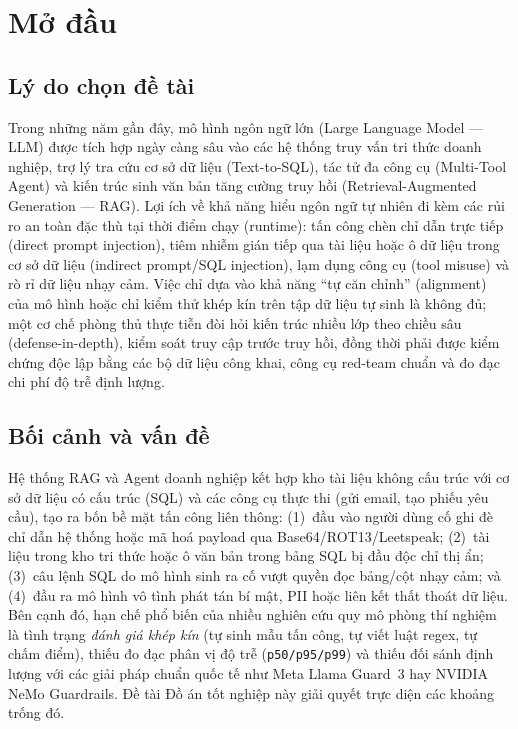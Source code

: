 \chapter*{Mở đầu}

\section*{Lý do chọn đề tài}

Trong những năm gần đây, mô hình ngôn ngữ lớn (Large Language Model --- LLM) được tích hợp ngày càng sâu vào các hệ thống truy vấn tri thức doanh nghiệp, trợ lý tra cứu cơ sở dữ liệu (Text-to-SQL), tác tử đa công cụ (Multi-Tool Agent) và kiến trúc sinh văn bản tăng cường truy hồi (Retrieval-Augmented Generation --- RAG). Lợi ích về khả năng hiểu ngôn ngữ tự nhiên đi kèm các rủi ro an toàn đặc thù tại thời điểm chạy (runtime): tấn công chèn chỉ dẫn trực tiếp (direct prompt injection), tiêm nhiễm gián tiếp qua tài liệu hoặc ô dữ liệu trong cơ sở dữ liệu (indirect prompt/SQL injection), lạm dụng công cụ (tool misuse) và rò rỉ dữ liệu nhạy cảm. Việc chỉ dựa vào khả năng ``tự căn chỉnh'' (alignment) của mô hình hoặc chỉ kiểm thử khép kín trên tập dữ liệu tự sinh là không đủ; một cơ chế phòng thủ thực tiễn đòi hỏi kiến trúc nhiều lớp theo chiều sâu (defense-in-depth), kiểm soát truy cập trước truy hồi, đồng thời phải được kiểm chứng độc lập bằng các bộ dữ liệu công khai, công cụ red-team chuẩn và đo đạc chi phí độ trễ định lượng.

\section*{Bối cảnh và vấn đề}

Hệ thống RAG và Agent doanh nghiệp kết hợp kho tài liệu không cấu trúc với cơ sở dữ liệu có cấu trúc (SQL) và các công cụ thực thi (gửi email, tạo phiếu yêu cầu), tạo ra bốn bề mặt tấn công liên thông: (1)~đầu vào người dùng cố ghi đè chỉ dẫn hệ thống hoặc mã hoá payload qua Base64/ROT13/Leetspeak; (2)~tài liệu trong kho tri thức hoặc ô văn bản trong bảng SQL bị đầu độc chỉ thị ẩn; (3)~câu lệnh SQL do mô hình sinh ra cố vượt quyền đọc bảng/cột nhạy cảm; và (4)~đầu ra mô hình vô tình phát tán bí mật, PII hoặc liên kết thất thoát dữ liệu. Bên cạnh đó, hạn chế phổ biến của nhiều nghiên cứu quy mô phòng thí nghiệm là tình trạng \emph{đánh giá khép kín} (tự sinh mẫu tấn công, tự viết luật regex, tự chấm điểm), thiếu đo đạc phân vị độ trễ (\texttt{p50/\allowbreak p95/\allowbreak p99}) và thiếu đối sánh định lượng với các giải pháp chuẩn quốc tế như Meta Llama Guard~3 hay NVIDIA NeMo Guardrails. Đề tài Đồ án tốt nghiệp này giải quyết trực diện các khoảng trống đó.

